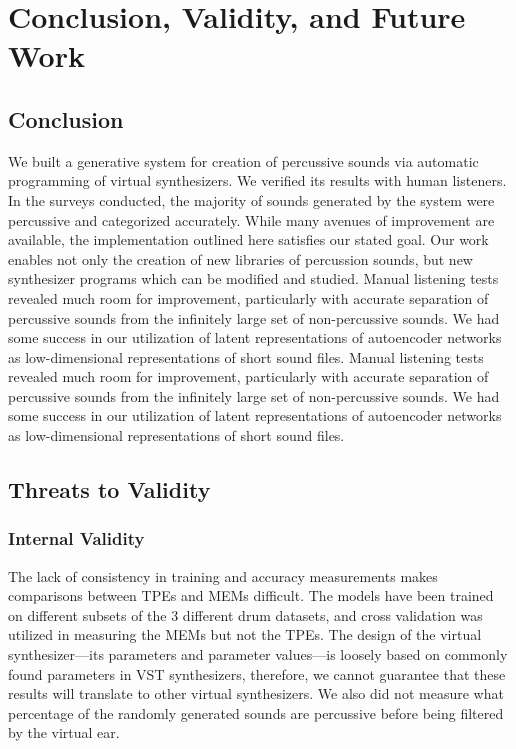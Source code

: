 \documentclass[\main/thesis.tex]{subfiles}
\begin{document}
\chapter{Conclusion, Validity, and Future Work} 

\section{Conclusion}  We built a generative system for creation of percussive sounds via automatic programming of virtual synthesizers. We verified its results with human listeners. In the surveys conducted, the majority of sounds generated by the system were percussive and categorized accurately. While many avenues of improvement are available, the implementation outlined here satisfies our stated goal. 
Our work enables not only the creation of new libraries of percussion sounds, but new synthesizer programs which can be modified and studied. 
Manual listening tests revealed much room for improvement, particularly with accurate separation of percussive sounds from the infinitely large set of non-percussive sounds. We had some success in our utilization of latent representations of autoencoder networks as low-dimensional representations of short sound files.
Manual listening tests revealed much room for improvement, particularly with accurate separation of percussive sounds from the infinitely large set of non-percussive sounds. We had some success in our utilization of latent representations of autoencoder networks as low-dimensional representations of short sound files. \\ 
\section{Threats to Validity}
\subsection{Internal Validity}
 The lack of consistency in training and accuracy measurements makes comparisons between TPEs and MEMs difficult. The models have been trained on different subsets of the 3 different drum datasets, and cross validation was utilized in measuring the MEMs but not the TPEs. The design of the virtual synthesizer---its parameters and parameter values---is loosely based on commonly found parameters in VST synthesizers, therefore, we cannot guarantee that these results will translate to other virtual synthesizers. We also did not measure what percentage of the randomly generated sounds are percussive before being filtered by the virtual ear. 
\end{document}
